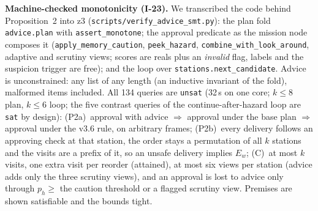 \textbf{Machine-checked monotonicity (I-23).} We transcribed the code behind Proposition~2 into z3 (\texttt{scripts/verify\_advice\_smt.py}): the plan fold \texttt{advice.plan} with \texttt{assert\_monotone}; the approval predicate as the mission node composes it (\texttt{apply\_memory\_caution}, \texttt{peek\_hazard}, \texttt{combine\_with\_look\_around}, adaptive and scrutiny views; scores are reals plus an \emph{invalid} flag, labels and the suspicion trigger are free); and the loop over \texttt{stations.next\_candidate}. Advice is unconstrained: any list of any length (an inductive invariant of the fold), malformed items included. All 134 queries are \texttt{unsat} (32\,s on one core; $k\le8$ plan, $k\le6$ loop; the five contrast queries of the continue-after-hazard loop are \texttt{sat} by design):
(P2a)~approval with advice $\Rightarrow$ approval under the base plan $\Rightarrow$ approval under the v3.6 rule, on arbitrary frames; (P2b)~every delivery follows an approving check at that station, the order stays a permutation of all $k$ stations and the visits are a prefix of it, so an unsafe delivery implies $E_w$; (C)~at most $k$ visits, one extra visit per reorder (attained), at most six views per station (advice adds only the three scrutiny views), and an approval is lost to advice only through $p_h\ge$ the caution threshold or a flagged scrutiny view. Premises are shown satisfiable and the bounds tight.
